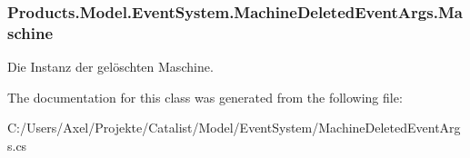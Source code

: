 \subsubsection[{\texorpdfstring{Maschine}{Maschine}}]{ Products.\+Model.\+Event\+System.\+Machine\+Deleted\+Event\+Args.\+Maschine\hspace{0.3cm}{\ttfamily [get]}}\hypertarget{class_products_1_1_model_1_1_event_system_1_1_machine_deleted_event_args_a7778078231013f5e82e66134d7694674}{}\label{class_products_1_1_model_1_1_event_system_1_1_machine_deleted_event_args_a7778078231013f5e82e66134d7694674}


Die Instanz der gelöschten Maschine. 



The documentation for this class was generated from the following file\+:\begin{DoxyCompactItemize}
\item 
C\+:/\+Users/\+Axel/\+Projekte/\+Catalist/\+Model/\+Event\+System/Machine\+Deleted\+Event\+Args.\+cs\end{DoxyCompactItemize}
